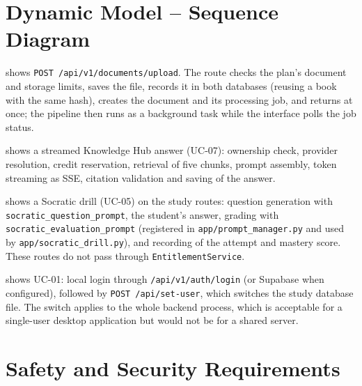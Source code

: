 
\section{Dynamic Model -- Sequence Diagram}

 shows \texttt{POST /api/v1/documents/upload}. The route checks the plan's
document and storage limits, saves the file, records it in both databases (reusing a book with
the same hash), creates the document and its processing job, and returns at once; the pipeline
then runs as a background task while the interface polls the job status.


 shows a streamed Knowledge Hub answer (UC-07): ownership check, provider
resolution, credit reservation, retrieval of five chunks, prompt assembly, token streaming as
SSE, citation validation and saving of the answer.


 shows a Socratic drill (UC-05) on the study routes: question generation
with \texttt{socratic\_question\_prompt}, the student's answer, grading with
\texttt{socratic\_evaluation\_prompt} (registered in \texttt{app/prompt\_manager.py} and used by
\texttt{app/socratic\_drill.py}), and recording of the attempt and mastery score. These routes
do not pass through \texttt{EntitlementService}.


 shows UC-01: local login through \texttt{/api/v1/auth/login} (or Supabase
when configured), followed by \texttt{POST /api/set-user}, which switches the study database
file. The switch applies to the whole backend process, which is acceptable for a single-user
desktop application but would not be for a shared server.


\section{Safety and Security Requirements}\label{sec:security}

